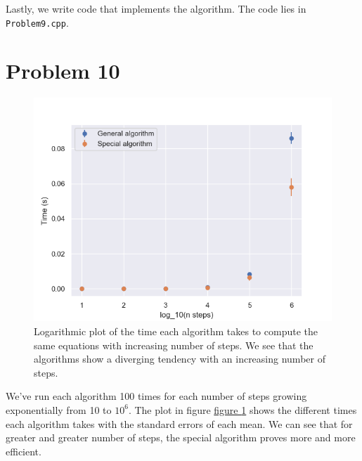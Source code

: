 \documentclass[english,notitlepage]{article}  %
\begin{document}
    Lastly, we write code that implements the algorithm. The code lies in \lstinline{Problem9.cpp}.

\section*{Problem 10}
    
    
\begin{figure}[H]
  \begin{center}
    \includegraphics*[width=\linewidth]{plot_P10.png}
    \caption{Logarithmic plot of the time each algorithm takes to compute the same equations with increasing number of steps. We see that the algorithms show a diverging tendency with an increasing number of steps.}
    \label{fig:P10}
  \end{center}
\end{figure}

We've run each algorithm 100 times for each number of steps growing exponentially from 10 to $10^6$. The plot in figure \hyperref[fig:P10]{figure \ref*{fig:P10}} shows the different times each algorithm takes with the standard errors of each mean. We can see that for greater and greater number of steps, the special algorithm proves more and more efficient.
\end{document}
